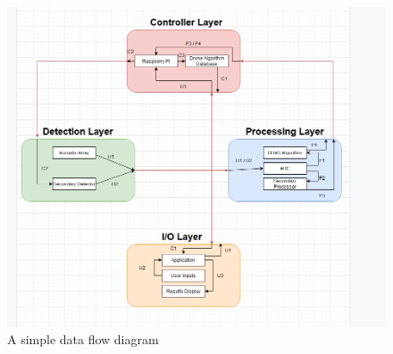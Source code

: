 \begin{figure}[h!]
	\centering
 	\includegraphics[width=\textwidth]{images/ads_dataflow.png}
 \caption{A simple data flow diagram}
\end{figure}
